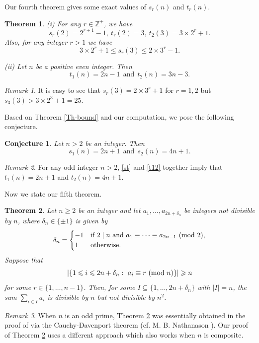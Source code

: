 \documentclass[11pt,reqno]{amsart}
\def\pmod #1{\ ({\rm{mod}}\ #1)}
\def\Z{\mathbb Z}
\def\t{\text}
\def\ls{\leqslant}
\def\gs{\geqslant}
\def\se {\subseteq}
\def\eq{\equiv}
\def\da{\delta}
\theoremstyle{plain}
\newtheorem{theorem}{Theorem}
\newtheorem{conjecture}{Conjecture}
\theoremstyle{definition}
\theoremstyle{remark}
\newtheorem{remark}{Remark}
\begin{document}
Our fourth theorem gives some exact values of $s_r(n)$ and $t_r(n)$.

\begin{theorem}\label{Th-value} {\rm (i)} For any $r\in\Z^+$, we have
\begin{equation} s_r(2)=2^{r+1}-1,\ t_r(2)=3,\ t_2(3)=3\times 2^r+1.
\end{equation}
Also, for any integer $r>1$ we have
\begin{equation}3\times2^r+1\ls s_r(3)\ls 2\times 3^r-1.
\end{equation}

{\rm (ii)} Let $n$ be a positive even integer. Then
\begin{equation}t_1(n)=2n-1\ \ \t{and}\ \ t_2(n)=3n-3.
\end{equation}
\end{theorem}
\begin{remark} It is easy to see that $s_r(3)=2\times3^r+1$ for $r=1,2$ but
$s_3(3)>3\times2^3+1=25$.
\end{remark}


Based on Theorem \ref{Th-bound} and our computation, we pose the following conjecture.

\begin{conjecture}\label{Conj1.2} Let $n>2$ be an integer. Then
\begin{equation}\label{st}
s_1(n)=2n+1\ \ \t{and}\ \ s_2(n)=4n+1.
\end{equation}
\end{conjecture}
\begin{remark} For any odd integer $n>2$,  \eqref{st} and \eqref{t12}
together imply that $t_1(n)=2n+1$ and $t_2(n)=4n+1$.
\end{remark}


Now we state our fifth theorem.

\begin{theorem} \label{Th1.2} Let $n\gs2$ be an integer and let $a_1,\ldots,a_{2n+\da_n}$ be integers not divisible by $n$, where $\da_n\in\{\pm1\}$ is given by
$$\da_n=\begin{cases}-1&\t{if}\ 2\mid n\ \t{and}\ a_1\eq\cdots\eq a_{2n-1}\pmod 2,
\\1&\t{otherwise}.\end{cases}$$
Suppose that
 $$|\{1\ls i\ls 2n+\da_n:\ a_i\eq r\pmod n\}|\gs n$$
 for some $r\in\{1,\ldots,n-1\}$.
 Then, for some $I\se\{1,\ldots,2n+\da_n\}$ with $|I|=n$, the sum $\sum_{i\in I}a_i$
 is divisible by $n$ but not divisible by $n^2$.
 \end{theorem}
 \begin{remark} When $n$ is an odd prime,
 Theorem \ref{Th1.2} was essentially obtained in the proof of
  \cite[Lemma 3.4]{G25} via the Cauchy-Davenport theorem
  (cf. M. B. Nathanason \cite[p.\,44]{N96}). Our proof of Theorem \ref{Th1.2}
  uses a different approach which also works when $n$ is composite.
 \end{remark}
\end{document}
